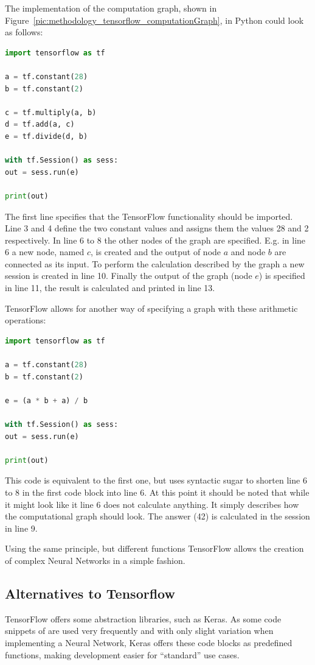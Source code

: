 The implementation of the computation graph, shown in Figure~\ref{pic:methodology_tensorflow_computationGraph}, in Python could look as follows:

\begin{lstlisting}[language=python]
import tensorflow as tf

a = tf.constant(28)
b = tf.constant(2)

c = tf.multiply(a, b)
d = tf.add(a, c)
e = tf.divide(d, b)

with tf.Session() as sess:
out = sess.run(e)

print(out)
\end{lstlisting}

The first line specifies that the TensorFlow functionality should be imported. Line 3 and 4 define the two constant values and assigns them the values 28 and 2 respectively. In line 6 to 8 the other nodes of the graph are specified. E.g. in line 6 a new node, named $c$, is created and the output of node $a$ and node $b$ are connected as its input. To perform the calculation described by the graph a new session is created in line 10. Finally the output of the graph (node $e$) is specified in line 11, the result is calculated and printed in line 13.

TensorFlow allows for another way of specifying a graph with these arithmetic operations:

\begin{lstlisting}[language=python]
import tensorflow as tf

a = tf.constant(28)
b = tf.constant(2)

e = (a * b + a) / b

with tf.Session() as sess:
out = sess.run(e)

print(out)
\end{lstlisting}

This code is equivalent to the first one, but uses syntactic sugar to shorten line 6 to 8 in the first code block into line 6. At this point it should be noted that while it might look like it line 6 does not calculate anything. It simply describes how the computational graph should look. The answer (42) is calculated in the session in line 9.

Using the same principle, but different functions TensorFlow allows the creation of complex Neural Networks in a simple fashion.

\subsection{Alternatives to Tensorflow}
TensorFlow offers some abstraction libraries, such as Keras. As some code snippets of are used very frequently and with only slight variation when implementing a Neural Network, Keras offers these code blocks as predefined functions, making development easier for ``standard'' use cases.


